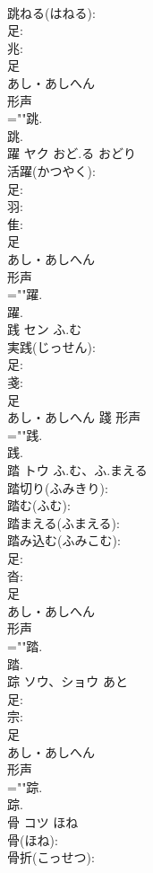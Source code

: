 \documentclass[8pt]{extreport}
\begin{document}
\begin{CJK}{UTF8}{min}
\\	跳ねる(はねる): 
\\	足: 
\\	兆: 
\\	足	
\\	あし・あしへん	
\\	形声 
\\	=""跳.
\\	跳.
\\	躍	ヤク	おど.る	おどり	
\\	活躍(かつやく): 
\\	足: 
\\	羽: 
\\	隹: 
\\	足	
\\	あし・あしへん	
\\	形声 
\\	=""躍.
\\	躍.
\\	践	セン	ふ.む		
\\	実践(じっせん): 
\\	足: 
\\	戔: 
\\	足	
\\	あし・あしへん	踐	形声 
\\	=""践.
\\	践.
\\	踏	トウ	ふ.む、ふ.まえる		
\\	踏切り(ふみきり): 
\\	踏む(ふむ): 
\\	踏まえる(ふまえる): 
\\	踏み込む(ふみこむ): 
\\	足: 
\\	沓: 
\\	足	
\\	あし・あしへん	
\\	形声 
\\	=""踏.
\\	踏.
\\	踪	ソウ、ショウ	あと		
\\	足: 
\\	宗: 
\\	足	
\\	あし・あしへん	
\\	形声 
\\	=""踪.
\\	踪.
\\	骨	コツ	ほね		
\\	骨(ほね): 
\\	骨折(こっせつ): 

\end{CJK}
\end{document}
